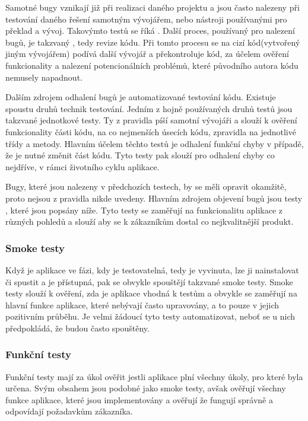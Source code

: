 \documentclass[czech,DP]{thesiskiv}
\begin{document}
Samotné bugy vznikají již při realizaci daného projektu a jsou často nalezeny při testování daného řešení samotným vývojářem, nebo nástroji používanými pro překlad a vývoj. Takovýmto testů se říká . Další proces, používaný pro nalezení bugů, je takzvaný , tedy revize kódu. Při tomto procesu se na cizí kód(vytvořený jiným vývojářem) podívá další vývojář a překontroluje kód, za účelem ověření funkcionality a nalezení potencionálních problémů, které původního autora kódu nemusely napadnout. 

Dalším zdrojem odhalení bugů je automatizované testování kódu. Existuje spoustu druhů technik testování. Jedním z hojně používaných druhů testů jsou takzvané jednotkové testy. Ty z pravidla píší samotní vývojáři a slouží k ověření funkcionality části kódu, na co nejmenších úsecích kódu, zpravidla na jednotlivé třídy a metody. Hlavním účelem těchto testů je odhalení funkční chyby v případě, že je nutné změnit část kódu. Tyto testy pak slouží pro odhalení chyby co nejdříve, v rámci životního cyklu aplikace. 

Bugy, které jsou nalezeny v předchozích testech, by se měli opravit okamžitě, proto nejsou z pravidla nikde uvedeny. Hlavním zdrojem objevení bugů jsou testy , které jsou popsány níže. Tyto testy se zaměřují na funkcionalitu aplikace z různých pohledů a slouží aby se k zákazníkům dostal co nejkvalitnější produkt.

\subsubsection*{Smoke testy}
Když je aplikace ve fázi, kdy je testovatelná, tedy je vyvinuta, lze ji nainstalovat či spustit a je přístupná, pak se obvykle spouštějí takzvané smoke testy. Smoke testy slouží k ověření, zda je aplikace vhodná k testům a obvykle se zaměřují na hlavní funkce aplikace, které nebývají často upravovány, a to pouze v jejich pozitivním průběhu. Je velmi žádoucí tyto testy automatizovat, neboť se u nich předpokládá, že budou často spouštěny.


\subsubsection*{Funkční testy}
Funkční testy mají za úkol ověřit jestli aplikace plní všechny úkoly, pro které byla určena. Svým obsahem jsou podobné jako smoke testy, avšak ověřují všechny funkce aplikace, které jsou implementovány a ověřují že fungují správně a odpovídají požadavkům zákazníka.  \citep{jorgensen2016software} 
\end{document}

